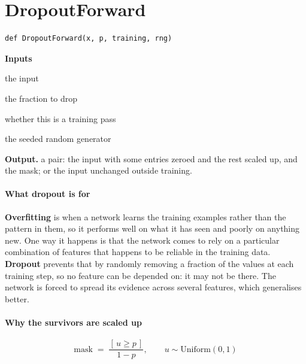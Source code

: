 \section{DropoutForward}
\begin{lstlisting}[style=sig]
def DropoutForward(x, p, training, rng)
\end{lstlisting}

\noindent\textbf{Inputs}
\begin{description}[leftmargin=2.2em,style=nextline,font=\normalfont\ttfamily]\setlength\itemsep{1pt}
  \item[{x}] \normalfont the input
  \item[{p}] \normalfont the fraction to drop
  \item[{training}] \normalfont whether this is a training pass
  \item[{rng}] \normalfont the seeded random generator
\end{description}

\noindent\textbf{Output.} a pair: the input with some entries zeroed and the rest scaled up, and the mask; or the input unchanged outside training.


\paragraph{What dropout is for}
\textbf{Overfitting} is when a network learns the training examples rather than the pattern in them, so it performs well on what it has seen and poorly on anything new. One way it happens is that the network comes to rely on a particular combination of features that happens to be reliable in the training data. \textbf{Dropout} \cite{srivastava2014} prevents that by randomly removing a fraction of the values at each training step, so no feature can be depended on: it may not be there. The network is forced to spread its evidence across several features, which generalises better.


\paragraph{Why the survivors are scaled up}

\begin{equation}
\mathrm{mask} \;=\; \frac{[\,u \ge p\,]}{1 - p}, \qquad u \sim \mathrm{Uniform}(0,1)
\end{equation}

